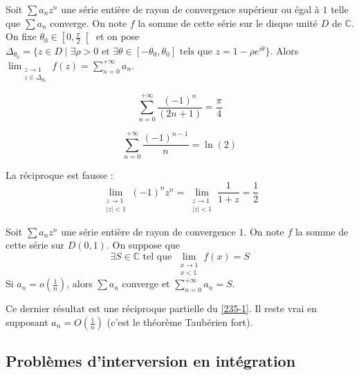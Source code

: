   \begin{theorem}
    \label{235-1}
    Soit $\sum a_n z^n$ une série entière de rayon de convergence supérieur ou égal à $1$ telle que $\sum a_n$ converge. On note $f$ la somme de cette série sur le disque unité $D$ de $\mathbb{C}$. On fixe $\theta_0 \in \left[ 0, \frac{\pi}{2} \right[$ et on pose $\Delta_{\theta_0} = \{ z \in D \mid \exists \rho > 0 \text{ et } \exists \theta \in [-\theta_0, \theta_0] \text{ tels que } z = 1 - \rho e^{i\theta} \}$.
    \newpar
    Alors $\lim_{\substack{z \rightarrow 1 \\ z \in \Delta_{\theta_0}}} f(z) = \sum_{n=0}^{+\infty} a_n$.
  \end{theorem}

  \begin{application}
    \[ \sum_{n=0}^{+\infty} \frac{(-1)^n}{(2n+1)} = \frac{\pi}{4} \]
  \end{application}

  \begin{application}
    \[ \sum_{n=0}^{+\infty} \frac{(-1)^{n-1}}{n} = \ln(2) \]
  \end{application}

  \begin{cexample}
    La réciproque est fausse :
    \[ \lim_{\substack{z \rightarrow 1 \\ \vert z \vert < 1}} (-1)^n z^n = \lim_{\substack{z \rightarrow 1 \\ \vert z \vert < 1}} \frac{1}{1+z} = \frac{1}{2} \]
  \end{cexample}

  \begin{theorem}
    Soit $\sum a_n z^n$ une série entière de rayon de convergence $1$. On note $f$ la somme de cette série sur $D(0,1)$. On suppose que
    \[ \exists S \in \mathbb{C} \text{ tel que } \lim_{\substack{x \rightarrow 1 \\ x < 1}} f(x) = S \]
    Si $a_n = o \left( \frac{1}{n} \right)$, alors $\sum a_n$ converge et $\sum_{n=0}^{+\infty} a_n = S$.
  \end{theorem}

  \begin{remark}
    Ce dernier résultat est une réciproque partielle du \cref{235-1}. Il reste vrai en supposant $a_n = O \left( \frac{1}{n} \right)$ (c'est le théorème Taubérien fort).
  \end{remark}

  \subsection{Problèmes d'interversion en intégration}

